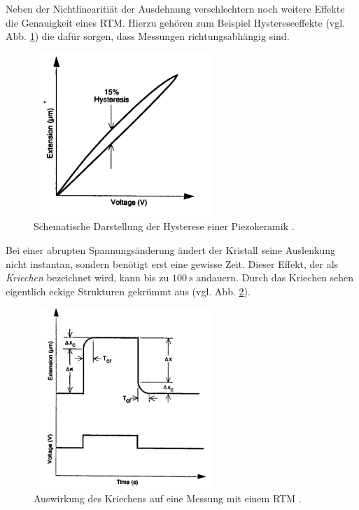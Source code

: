 Neben der Nichtlinearitiät der Ausdehnung verschlechtern noch weitere %
Effekte die Genauigkeit eines RTM. Hierzu gehören zum Beispiel Hystereseeffekte (vgl. Abb. \ref{fig: hysterese}) die dafür sorgen,
dass Messungen richtungsabhängig sind.
\begin{figure}[!h]
  \centering
  \includegraphics[width=0.6\textwidth]{./pics/hysterese.png}
  \caption{Schematische Darstellung der Hysterese einer Piezokeramik \cite{rtm}.}
  \label{fig: hysterese}
\end{figure}
Bei einer abrupten Spannungsänderung ändert der Kristall seine Auslenkung nicht instantan, sondern benötigt erst eine gewisse Zeit.
Dieser Effekt, der als \emph{Kriechen} bezeichnet wird, kann bis zu $\SI{100}{\second}$ andauern.
Durch das Kriechen sehen eigentlich eckige Strukturen gekrümmt aus (vgl. Abb. \ref{fig: creep}).
\begin{figure}[!h]
  \centering
  \includegraphics[width=0.6\textwidth]{./pics/creep.png}
  \caption{Auswirkung des Kriechens auf eine Messung mit einem RTM \cite{rtm}.}
  \label{fig: creep}
\end{figure}
